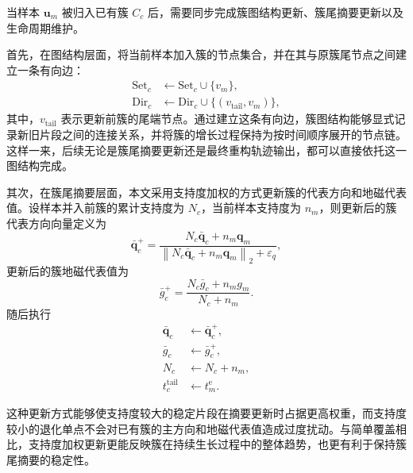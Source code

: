 \documentclass{xdupgthesis}
\begin{document}
当样本 $\mathbf{u}_m$ 被归入已有簇 $C_c$ 后，需要同步完成簇图结构更新、簇尾摘要更新以及生命周期维护。

首先，在图结构层面，将当前样本加入簇的节点集合，并在其与原簇尾节点之间建立一条有向边：
\begin{equation}
	\begin{aligned}
		\mathrm{Set}_c&\leftarrow \mathrm{Set}_c\cup\{v_m\},\\
		\mathrm{Dir}_c&\leftarrow \mathrm{Dir}_c\cup\{(v_{\mathrm{tail}},v_m)\},
	\end{aligned}
\end{equation}
其中，$v_{\mathrm{tail}}$ 表示更新前簇的尾端节点。通过建立这条有向边，簇图结构能够显式记录新旧片段之间的连接关系，并将簇的增长过程保持为按时间顺序展开的节点链。这样一来，后续无论是簇尾摘要更新还是最终重构轨迹输出，都可以直接依托这一图结构完成。


其次，在簇尾摘要层面，本文采用支持度加权的方式更新簇的代表方向和地磁代表值。设样本并入前簇的累计支持度为 $N_c$，当前样本支持度为 $n_m$，则更新后的簇代表方向向量定义为
\begin{equation}
	\bar{\mathbf{q}}_c^{+}=
	\frac{
		N_c\bar{\mathbf{q}}_c+n_m\mathbf{q}_m
	}{
		\left\|
		N_c\bar{\mathbf{q}}_c+n_m\mathbf{q}_m
		\right\|_2+\varepsilon_q
	},
\end{equation}
更新后的簇地磁代表值为
\begin{equation}
	\bar{g}_c^{+}=
	\frac{N_c\bar{g}_c+n_m g_m}{N_c+n_m}.
\end{equation}
随后执行
\begin{equation}
	\begin{aligned}
		\bar{\mathbf{q}}_c&\leftarrow \bar{\mathbf{q}}_c^{+},\\
		\bar{g}_c&\leftarrow \bar{g}_c^{+},\\
		N_c&\leftarrow N_c+n_m,\\
		t_c^{\mathrm{tail}}&\leftarrow t_m^{\mathrm{e}}.
	\end{aligned}
\end{equation}

这种更新方式能够使支持度较大的稳定片段在摘要更新时占据更高权重，而支持度较小的退化单点不会对已有簇的主方向和地磁代表值造成过度扰动。与简单覆盖相比，支持度加权更新更能反映簇在持续生长过程中的整体趋势，也更有利于保持簇尾摘要的稳定性。
\end{document}
